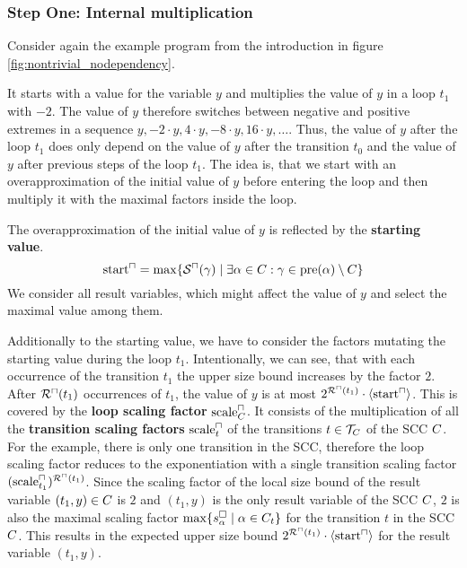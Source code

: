 \subsubsection{Step One: Internal multiplication}

Consider again the example program from the introduction in figure \ref{fig:nontrivial_nodependency}.



It starts with a value for the variable $y$ and multiplies the value of $y$ in a loop $t_1$ with $-2$.
The value of $y$ therefore switches between negative and positive extremes in a sequence $y, -2 \cdot y, 4 \cdot y, -8 \cdot y, 16 \cdot y, \dots$.
Thus, the value of $y$ after the loop $t_1$ does only depend on the value of $y$ after the transition $t_0$ and the value of $y$ after previous steps of the loop $t_1$.
The idea is, that we start with an overapproximation of the initial value of $y$ before entering the loop and then multiply it with the maximal factors inside the loop.

The overapproximation of the initial value of $y$ is reflected by the \textbf{starting value}.
\[ \text{start}^\sqcap = \max \lbrace {\mathcal{S}^\sqcap}(\gamma) \mid \exists \alpha \in C: \gamma \in \text{pre}(\alpha) \setminus C \rbrace \]
We consider all result variables, which might affect the value of $y$ and select the maximal value among them.

Additionally to the starting value, we have to consider the factors mutating the starting value during the loop $t_1$.
Intentionally, we can see, that with each occurrence of the transition $t_1$ the upper size bound increases by the factor $2$.
After ${\mathcal{R}^\sqcap}(t_1)$ occurrences of $t_1$, the value of $y$ is at most $2^{{\mathcal{R}^\sqcap}(t_1)} \cdot \langle\text{start}^\sqcap\rangle$.
This is covered by the \textbf{loop scaling factor} $\text{scale}^\sqcap_C$.
It consists of the multiplication of all the \textbf{transition scaling factors} $\text{scale}^\sqcap_t$ of the transitions $t \in \mathcal{T}_C$ of the SCC $C$.
For the example, there is only one transition in the SCC, therefore the loop scaling factor reduces to the exponentiation with a single transition scaling factor $(\text{scale}^\sqcap_{t_1})^{{\mathcal{R}^\sqcap}(t_1)}$.
Since the scaling factor of the local size bound of the result variable $(t_1,y) \in C$ is $2$ and $(t_1,y)$ is the only result variable of the SCC $C$, $2$ is also the maximal scaling factor $\max \lbrace s^\square_{\alpha} \mid \alpha \in C_t \rbrace$ for the transition $t$ in the SCC $C$.
This results in the expected upper size bound $2^{{\mathcal{R}^\sqcap}(t_1)} \cdot \langle\text{start}^\sqcap\rangle$ for the result variable $(t_1,y)$.

